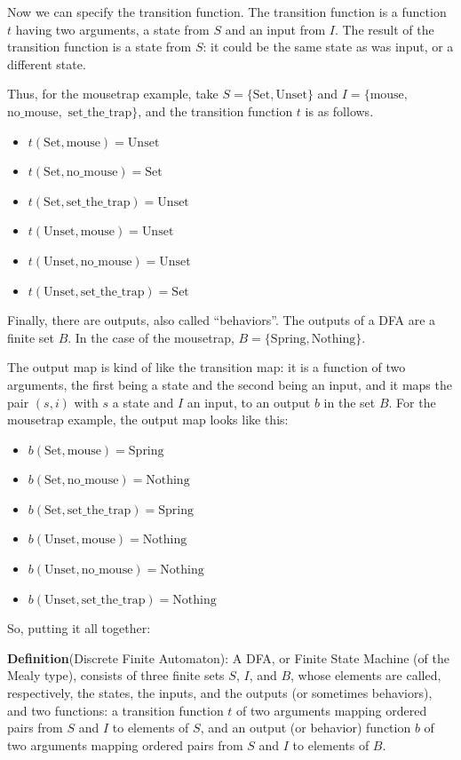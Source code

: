 \documentclass[letter,12pt]{article}
\begin{document}
Now we can specify the transition function.  The transition function is a function $t$ having two arguments, a state from $S$ and an input from $I$.  The result of the transition function is a state from $S$: it could be the same state as was input, or a different state.  

Thus, for the mousetrap example, take $S = \{\textrm{Set}, \textrm{Unset}\}$ and $I=\{\textrm{mouse},$ $\textrm{no\_mouse},$ $\textrm{set\_the\_trap}\}$, and the transition function $t$ is as follows.

\begin{itemize}
\item $t(\textrm{Set}, \textrm{mouse}) =  \textrm{Unset}$
\item $t(\textrm{Set}, \textrm{no\_mouse}) =  \textrm{Set}$
\item $t(\textrm{Set}, \textrm{set\_the\_trap}) =  \textrm{Unset}$
\item $t(\textrm{Unset}, \textrm{mouse}) =  \textrm{Unset}$
\item $t(\textrm{Unset}, \textrm{no\_mouse}) =  \textrm{Unset}$
\item $t(\textrm{Unset}, \textrm{set\_the\_trap}) =  \textrm{Set}$
\end{itemize}

Finally, there are outputs, also called “behaviors”.  The outputs of a DFA are a finite set $B$.  In the case of the mousetrap, $B = \{\textrm{Spring}, \textrm{Nothing}\}$.

The output map is kind of like the transition map: it is a function of two arguments, the first being a state and the second being an input, and it maps the  pair $(s,i)$ with $s$ a state and $I$ an input, to an output $b$ in the set $B$.  For the mousetrap example, the output map looks like this:

\begin{itemize}
\item $b(\textrm{Set}, \textrm{mouse}) =  \textrm{Spring}$
\item $b(\textrm{Set}, \textrm{no\_mouse}) =  \textrm{Nothing}$
\item $b(\textrm{Set}, \textrm{set\_the\_trap}) =  \textrm{Spring}$
\item $b(\textrm{Unset}, \textrm{mouse}) =  \textrm{Nothing}$
\item $b(\textrm{Unset}, \textrm{no\_mouse}) =  \textrm{Nothing}$
\item $b(\textrm{Unset}, \textrm{set\_the\_trap}) =  \textrm{Nothing}$
\end{itemize}

So, putting it all together:

\textbf{Definition}(Discrete Finite Automaton): A DFA, or Finite State Machine (of the Mealy type), consists of three finite sets $S$, $I$, and $B$, whose elements are called, respectively, the states, the inputs, and the outputs (or sometimes behaviors), and two functions: a transition function $t$ of two arguments mapping ordered pairs from $S$ and $I$ to elements of $S$, and an output (or behavior) function $b$ of two arguments mapping ordered pairs from $S$ and $I$ to elements of $B$.
\end{document}
